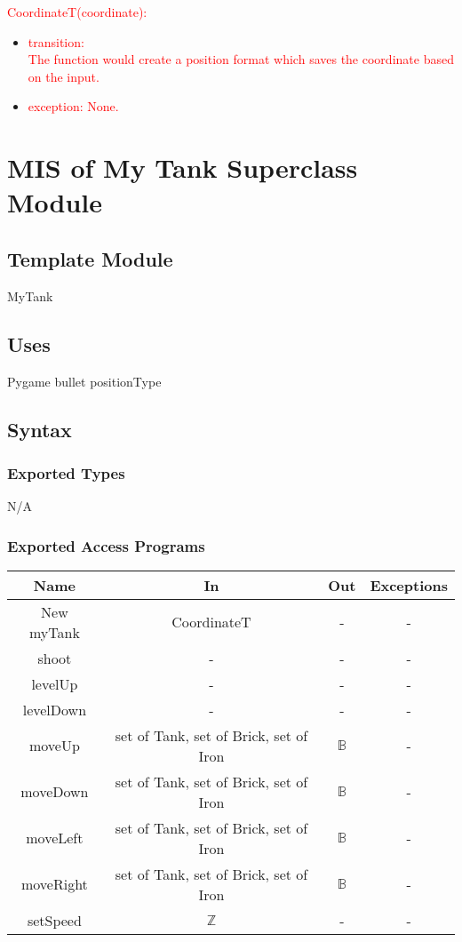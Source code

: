 \documentclass[12pt, titlepage]{article}
\begin{document}
        \textcolor{red}{CoordinateT(coordinate):}
		\begin{itemize}
		\item \textcolor{red}{transition: \\}
		\textcolor{red}{The function would create a position format which saves the coordinate based on the input.}
		
		\item \textcolor{red}{exception: None.}
        \end{itemize}
        
				
\section{MIS of My Tank Superclass Module}
        \subsection{Template Module}
        MyTank
        \subsection{Uses}
        Pygame
        bullet
        positionType
		\subsection{Syntax}
		\subsubsection{Exported Types}
		N/A
		\subsubsection{Exported Access Programs}
				\begin{tabular}[pos]{|c|c|c|c|}
					
					\hline
					\textbf{Name} & \textbf{In} & \textbf{Out} & \textbf{Exceptions} \\ \hline
					New myTank & CoordinateT & - & - \\ \hline
					shoot & - & - & -\\ \hline
					levelUp & - & - & -\\ \hline
					levelDown & - & - & -\\ \hline
					moveUp & set of Tank, set of Brick, set of Iron & $\mathbb{B}$ & -\\ \hline
					moveDown & set of Tank, set of Brick, set of Iron & $\mathbb{B}$ & -\\ \hline
					moveLeft & set of Tank, set of Brick, set of Iron & $\mathbb{B}$ & -\\ \hline
					moveRight & set of Tank, set of Brick, set of Iron & $\mathbb{B}$ & -\\ \hline
                    setSpeed & $\mathbb{Z}$ & - & -\\ \hline
				\end{tabular}
				
\end{document}
